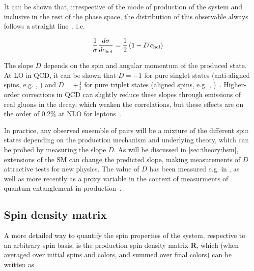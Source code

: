 It can be shown that, irrespective of the mode of production of the \ttbar system and inclusive in the rest of the phase space, the distribution of this observable always follows a straight line~\cite{Bernreuther:2004jv}, i.e.

\begin{equation}
\label{eq:theory:chel}
    \frac{1}{\sigma} \frac{d \sigma}{d c_{\mathrm{hel}}} = \frac{1}{2} \left( 1 - D \, c_{\mathrm{hel}} \right)
\end{equation}

The slope $D$ depends on the spin and angular momentum of the produced \ttbar state. At LO in QCD, it can be shown that $D=-1$ for pure singlet states (anti-aligned spins, e.g. , ) and $D=+\frac{1}{3}$ for pure triplet states (aligned spins, e.g. , )~\cite{Maltoni:2024tul,Cheng:2024btk}. Higher-order corrections in QCD can slightly reduce these slopes through emissions of real gluons in the decay, which weaken the correlations, but these effects are on the order of $0.2\%$ at NLO for leptons~\cite{Czarnecki:1990pe,Bernreuther:2003ga}. %

In practice, any observed ensemble of \ttbar pairs will be a mixture of the different spin states depending on the production mechanism and underlying theory, which can be probed by measuring the slope $D$. As will be discussed in \cref{sec:theory:bsm}, extensions of the SM can change the predicted slope, making measurements of $D$ attractive tests for new physics. The value of $D$ has been measured e.g. in , as well as more recently as a proxy variable in the context of measurments of quantum entanglement in \ttbar production~\cite{CMS:TOP-23-001,ATLAS:2023fsd}.


\subsection{Spin density matrix}
\label{sec:theory:spindensity}

A more detailed way to quantify the spin properties of the \ttbar system, respective to an arbitrary spin basis, is the production spin density matrix $\mathbf{R}$, which (when averaged over initial spins and colors, and summed over final colors) can be written as~\cite{Maltoni:2024tul,Cheng:2024btk,Anuar:PhD}

